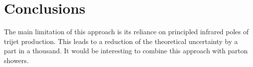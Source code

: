 \section{Conclusions}\label{sec:conclusions}

The main limitation of this approach is its reliance on principled
infrared poles of trijet production. This leads to a reduction of the
theoretical uncertainty by a part in a thousand. It would be interesting
to combine this approach with parton showers.

